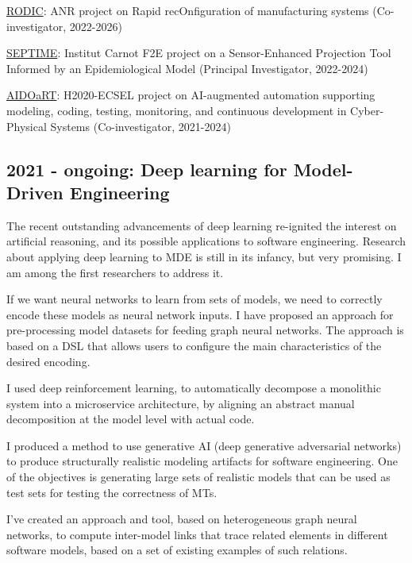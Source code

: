 \documentclass[10pt,a4paper]{article}
\begin{document}
\medskip
{\footnotesize
  \href{https://rodic.ls2n.fr/}{RODIC}: ANR project on Rapid
  recOnfiguration of manufacturing systems (Co-investigator, 2022-2026)

  \href{https://www6.angers-nantes.inrae.fr/bioepar/Recherche/Projets-en-cours/SEPTIME}{SEPTIME}:
  Institut Carnot F2E project on a Sensor-Enhanced Projection Tool
  Informed by an Epidemiological Model (Principal Investigator,
  2022-2024)

  \href{https://www.aidoart.eu/}{AIDOaRT}: H2020-ECSEL project on
  AI-augmented automation supporting modeling, coding, testing,
  monitoring, and continuous development in Cyber-Physical Systems
  (Co-investigator, 2021-2024)
}

\subsection{2021 - ongoing: Deep learning for Model-Driven Engineering}

The recent outstanding advancements of deep learning re-ignited the interest on artificial reasoning, and its possible applications to software engineering. Research about applying deep learning to MDE is still in its infancy, but very promising. I am among the first researchers to address it. 

If we want neural networks to learn from sets of models, we need to correctly encode these models as neural network inputs.
I have proposed an approach for pre-processing model datasets for feeding graph neural networks. The approach is based on a DSL that allows users to configure the main characteristics of the desired encoding. 

I used deep reinforcement learning, to automatically decompose a monolithic system into a microservice architecture, by aligning an abstract manual decomposition at the model level with actual code.

I produced a method to use generative AI (deep generative adversarial networks) to produce structurally realistic modeling artifacts for software engineering. One of the objectives is generating large sets of realistic models that can be used as test sets for testing the correctness of MTs.

I've created an approach and tool, based on heterogeneous graph neural networks, to compute inter-model links that trace related elements in different software models, based on a set of existing examples of such relations.

\end{document}
